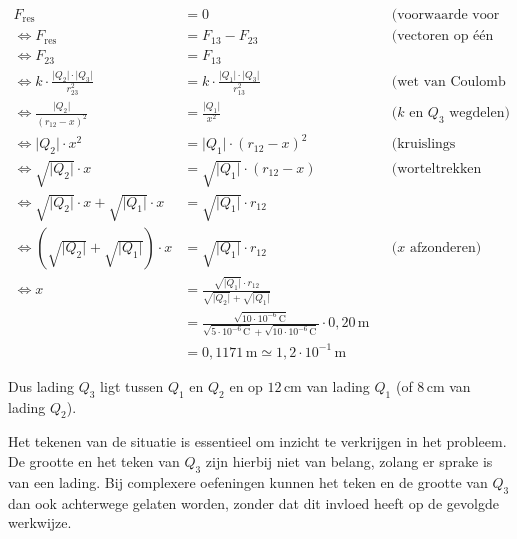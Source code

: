 \documentclass{ximera}
\begin{document}
\begin{example}[foldable=true,title={Voorbeeld: Drie ladingen op één lijn of lading in evenwicht}]
\begin{solution}
        \begin{align*}
            F_{\text{res}} &= 0 && \text{(voorwaarde voor rust)} \\
            \Leftrightarrow F_{\text{res}} &= F_{13} - F_{23} && \text{(vectoren op één lijn optellen)} \\
            \Leftrightarrow F_{23} &= F_{13} \\
            \Leftrightarrow k \cdot \frac{\lvert Q_{2}\rvert \cdot \lvert Q_{3}\rvert}{r_{23}^{2}} &= k \cdot \frac{\lvert Q_{1}\rvert \cdot \lvert Q_{3}\rvert}{r_{13}^{2}} && \text{(wet van Coulomb invullen)} \\
            \Leftrightarrow \frac{\lvert Q_{2}\rvert}{(r_{12}-x)^{2}} &= \frac{\lvert Q_{1}\rvert}{x^{2}} && \text{($k$ en $Q_3$ wegdelen)} \\
            \Leftrightarrow \lvert Q_{2}\rvert \cdot x^{2} &= \lvert Q_{1}\rvert \cdot (r_{12}-x)^{2} && \text{(kruislings vermenigvuldigen)} \\
            \Leftrightarrow \sqrt{\lvert Q_{2}\rvert} \cdot x &= \sqrt{\lvert Q_{1}\rvert} \cdot (r_{12}-x) && \text{(worteltrekken beiderzijds)} \\
            \Leftrightarrow \sqrt{\lvert Q_{2}\rvert} \cdot x + \sqrt{\lvert Q_{1}\rvert} \cdot x &= \sqrt{\lvert Q_{1}\rvert} \cdot r_{12} \\
            \Leftrightarrow (\sqrt{\lvert Q_{2}\rvert} + \sqrt{\lvert Q_{1}\rvert}) \cdot x &= \sqrt{\lvert Q_{1}\rvert} \cdot r_{12} && \text{($x$ afzonderen)} \\
            \Leftrightarrow x &= \frac{\sqrt{\lvert Q_{1}\rvert} \cdot r_{12}}{\sqrt{\lvert Q_{2}\rvert} + \sqrt{\lvert Q_{1}\rvert}} \\
            &= \frac{\sqrt{10 \cdot 10^{-6} \, \mathrm{C}}}{\sqrt{5 \cdot 10^{-6} \, \mathrm{C}} + \sqrt{10 \cdot 10^{-6} \, \mathrm{C}}} \cdot 0{,}20 \, \mathrm{m} \\
            &= 0{,}1171 \, \mathrm{m} \simeq 1{,}2 \cdot 10^{-1} \, \mathrm{m}
        \end{align*}
        
        Dus lading $Q_{3}$ ligt tussen $Q_{1}$ en $Q_{2}$ en op $12 \, \mathrm{cm}$ van lading $Q_{1}$ (of $8 \, \mathrm{cm}$ van lading $Q_{2}$).
        
        \begin{hint}
            Het tekenen van de situatie is essentieel om inzicht te verkrijgen in het probleem. De grootte en het teken van $Q_{3}$ zijn hierbij niet van belang, zolang er sprake is van een lading. Bij complexere oefeningen kunnen het teken en de grootte van $Q_{3}$ dan ook achterwege gelaten worden, zonder dat dit invloed heeft op de gevolgde werkwijze.
        \end{hint}
    \end{solution}
\end{example}
\end{document}
